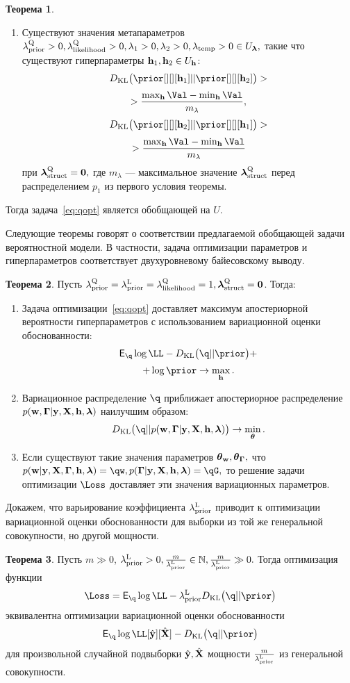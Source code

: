 \documentclass[11pt, a5paper]{dissert}
\theoremstyle{definition}
\newtheorem{theorem}{Теорема}
\begin{document}
{\begin{theorem}
\begin{enumerate}
\item Существуют значения метапараметров $\lambda_\text{prior}^\text{Q}>0,\lambda_\text{likelihood}^\text{Q}>0, \lambda_1>0, \lambda_2>0, \lambda_{\text{temp}}>0  \in U_{\boldsymbol{\lambda}},$ такие что существуют гиперпараметры $\mathbf{h}_1, \mathbf{h}_2 \in U_{\mathbf{h}}$:
\[
\KL{\prior[][][\h_1]}{\prior[][][\h_2]} > 
\]
\[
>\frac{\max_{\h} \Val - \min_{\h} \Val }{m_{\lambda}},
\]
\[
\KL{\prior[][][\h_2]}{\prior[][][\h_1]} >
\]
\[
> \frac{\max_{\h} \Val - \min_{\h} \Val }{m_{\lambda}}
\]
при $\boldsymbol{\lambda}_\text{struct}^\text{Q} = \mathbf{0},$ где $m_{\lambda}$ --- максимальное значение $\boldsymbol{\lambda}_\text{struct}^\text{Q}$ перед распределением $p_1$ из первого условия теоремы.

\end{enumerate}
Тогда задача~\eqref{eq:qopt} является обобщающей на $U$.
\end{theorem}



Следующие теоремы говорят о соответствии предлагаемой обобщающей задачи вероятностной модели. В частности, задача оптимизации параметров и гиперпараметров соответствует двухуровневому байесовскому выводу.
\begin{theorem}
Пусть ${\lambda_\text{prior}^\text{Q}} = \lambda_\text{prior}^\text{L}=\lambda_\text{likelihood}^\text{Q} = 1, \boldsymbol{\lambda}_\text{struct}^\text{Q}=\mathbf{0}$. Тогда:
\begin{enumerate}
\item Задача оптимизации~\eqref{eq:qopt} доставляет максимум апостериорной вероятности гиперпараметров с использованием вариационной оценки обоснованности:
\[
    \E_{\q}\log \LL - \KL{\q}{\prior} +
\]
\[
+ \log \prior \to \max_{\h}.
\]
\item Вариационное распределение $\q$ приближает апостериорное распределение $p(\mathbf{w}, \boldsymbol{\Gamma}|\mathbf{y}, \mathbf{X}, \mathbf{h},\boldsymbol{\lambda})$ наилучшим образом:
\[
    \KL{\q}{\post} \to \min_{\teta}.
\]


\item Если существуют такие значения параметров $\boldsymbol{\theta}_\mathbf{w}, \boldsymbol{\theta}_{\boldsymbol{\Gamma}},$ что $\postw = \qw, \postG = \qG,$
то решение задачи оптимизации $\Loss$ доставляет эти значения вариационных параметров.  
\end{enumerate}
\end{theorem}

Докажем, что варьирование коэффициента $\lambda_\text{prior}^\text{L}$ приводит к оптимизации вариационной оценки обоснованности для выборки из той же генеральной совокупности, но другой мощности.
\begin{theorem}
\label{th:elbo_size}
Пусть $m \gg 0$, $\lambda_\text{prior}^\text{L} > 0, \frac{m}{\lambda_\text{prior}^\text{L}}   \in \mathbb{N}, \frac{m}{\lambda_\text{prior}^\text{L}}  \gg 0.$ Тогда оптимизация функции
\[
\Loss = \E_{\q} \log \LL - \lamCL\KL{\q}{\prior}
\]
 эквивалентна оптимизации вариационной оценки обоснованности  $$\E_{\q} \log \LL[\hat{\y}][\hat{\X}] - \KL{\q}{\prior}$$
для произвольной случайной подвыборки $\hat{\mathbf{y}}, \hat{\mathbf{X}}$ мощности $\frac{m}{{\lambda_\text{prior}^\text{L}}}$ из генеральной совокупности.
\end{theorem}


}
\end{document}
